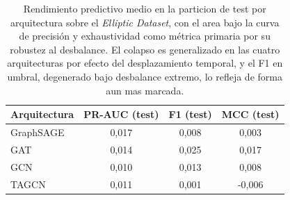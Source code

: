 \begin{table}[htbp]
\centering
\renewcommand{\arraystretch}{1.3}
\begin{tabular}{lccc}
\toprule
\textbf{Arquitectura} & \textbf{PR-AUC (test)} & \textbf{F1 (test)} & \textbf{MCC (test)} \\
\midrule
GraphSAGE & 0,017 & 0,008 & 0,003 \\
GAT & 0,014 & 0,025 & 0,017 \\
GCN & 0,010 & 0,013 & 0,008 \\
TAGCN & 0,011 & 0,001 & -0,006 \\
\bottomrule
\end{tabular}
\caption{Rendimiento predictivo medio en la particion de test por arquitectura sobre el \textit{Elliptic Dataset}, con el area bajo la curva de precisión y exhaustividad como métrica primaria por su robustez al desbalance. El colapso es generalizado en las cuatro arquitecturas por efecto del desplazamiento temporal, y el F1 en umbral, degenerado bajo desbalance extremo, lo refleja de forma aun mas marcada.}
\label{tab:elliptic-perf}
\end{table}
